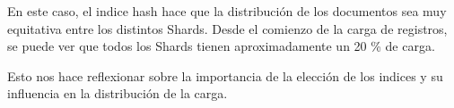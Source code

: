 En este caso, el indice hash hace que la distribución de los documentos sea muy equitativa entre los distintos Shards. Desde el comienzo de la carga de registros, se puede ver que todos los Shards tienen aproximadamente un 20 \% de carga.

Esto nos hace reflexionar sobre la importancia de la elección de los indices y su influencia en la distribución de la carga.


